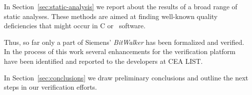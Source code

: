 In Section~\ref{sec:static-analysis} we report about the results of a broad range
of static analyses. 
These methods are aimed at finding well-known quality deficiencies that
might occur in C or \CC\ software.

Thus, so far only a part of Siemens' \emph{BitWalker} has been formalized and verified.
In the process of this work several enhancements for the \framac verification platform
have been identified and reported to the developers at {CEA LIST}.

In Section~\ref{sec:conclusions} we draw preliminary conclusions
and outline the next steps in our verification efforts.

